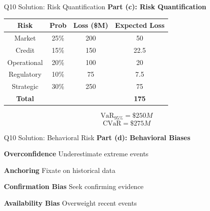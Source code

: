 \documentclass[aspectratio=169,10pt]{beamer}
\renewcommand{\small}{\fontsize{6pt}{7.5pt}\selectfont}
\renewcommand{\large}{\fontsize{8pt}{10pt}\selectfont}
\newcommand{\question}[1]{{\large\bfseries\color{crimson}#1}}
\begin{document}
	\begin{frame}{Q10 Solution: Risk Quantification}
		\question{Part (c): Risk Quantification}
		\small
		\begin{table}[h]
			\centering
			\begin{tabular}{|c|c|c|c|}
				\hline
				\textbf{Risk} & \textbf{Prob} & \textbf{Loss (\$M)} & \textbf{Expected Loss} \\
				\hline
				Market & 25\% & 200 & 50 \\
				Credit & 15\% & 150 & 22.5 \\
				Operational & 20\% & 100 & 20 \\
				Regulatory & 10\% & 75 & 7.5 \\
				Strategic & 30\% & 250 & 75 \\
				\hline
				\textbf{Total} & & & \textbf{175} \\
				\hline
			\end{tabular}
		\end{table}
		
		\vspace{0.1cm}
		\[
		\boxed{\text{VaR}_{95\%} = \$250M}
		\]
		\[
		\boxed{\text{CVaR} = \$275M}
		\]
	\end{frame}
	
	\begin{frame}{Q10 Solution: Behavioral Risk}
		\question{Part (d): Behavioral Biases}
		\small
		
		\textbf{Overconfidence}
		Underestimate extreme events
		
		\vspace{0.1cm}
		\textbf{Anchoring}
		Fixate on historical data
		
		\vspace{0.1cm}
		\textbf{Confirmation Bias}
		Seek confirming evidence
		
		\vspace{0.1cm}
		\textbf{Availability Bias}
		Overweight recent events
	\end{frame}
	
\end{document}
